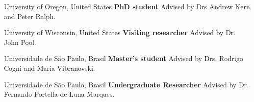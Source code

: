 	{%
		University of Oregon, United States
    }
	{%
		\textbf{PhD student}
    }
	{%
        Advised by Drs Andrew Kern and Peter Ralph.
    }

	{%
		University of Wisconsin, United States
    }
	{%
		\textbf{Visiting researcher}
    }
	{%
        Advised by Dr. John Pool.
    }

	{%
		Universidade de São Paulo, Brasil
    }
	{%
		\textbf{Master's student}
    }
	{%
        Advised by Drs. Rodrigo Cogni and Maria Vibranovski.
    }

	{%
		Universidade de São Paulo, Brasil
    }
	{%
		\textbf{Undergraduate Researcher}
    }
	{%
        Advised by Dr. Fernando Portella de Luna Marques.
    }

